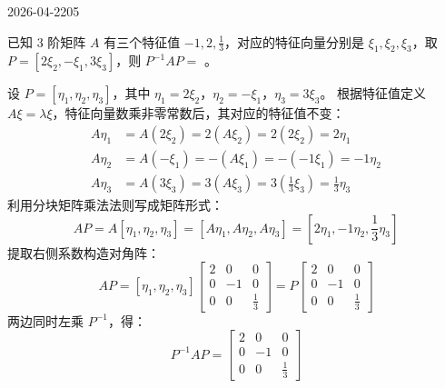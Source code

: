 \begin{mistake}{2026-04-22}{05}

\begin{problemcontent}
已知 3 阶矩阵 \(A\) 有三个特征值 \(-1, 2, \frac{1}{3}\)，对应的特征向量分别是 \(\xi_1, \xi_2, \xi_3\)，取 \(P=[2\xi_2, -\xi_1, 3\xi_3]\)，则 \(P^{-1}AP =\) \underline{\hspace{2cm}}。
\end{problemcontent}

\begin{solutioncontent}
设 \(P=[\eta_1, \eta_2, \eta_3]\)，其中 \(\eta_1=2\xi_2\)，\(\eta_2=-\xi_1\)，\(\eta_3=3\xi_3\)。
根据特征值定义 \(A\xi = \lambda\xi\)，特征向量数乘非零常数后，其对应的特征值不变：
\[
\begin{aligned}
A\eta_1 &= A(2\xi_2) = 2(A\xi_2) = 2(2\xi_2) = 2\eta_1 \\
A\eta_2 &= A(-\xi_1) = -(A\xi_1) = -(-1\xi_1) = -1\eta_2 \\
A\eta_3 &= A(3\xi_3) = 3(A\xi_3) = 3(\frac{1}{3}\xi_3) = \frac{1}{3}\eta_3
\end{aligned}
\]
利用分块矩阵乘法法则写成矩阵形式：
\[
AP = A[\eta_1, \eta_2, \eta_3] = [A\eta_1, A\eta_2, A\eta_3] = [2\eta_1, -1\eta_2, \frac{1}{3}\eta_3]
\]
提取右侧系数构造对角阵：
\[
AP = [\eta_1, \eta_2, \eta_3] \begin{bmatrix} 2 & 0 & 0 \\ 0 & -1 & 0 \\ 0 & 0 & \frac{1}{3} \end{bmatrix} = P \begin{bmatrix} 2 & 0 & 0 \\ 0 & -1 & 0 \\ 0 & 0 & \frac{1}{3} \end{bmatrix}
\]
两边同时左乘 \(P^{-1}\)，得：
\[
P^{-1}AP = \begin{bmatrix} 2 & 0 & 0 \\ 0 & -1 & 0 \\ 0 & 0 & \frac{1}{3} \end{bmatrix}
\]
\end{solutioncontent}


\end{mistake}
